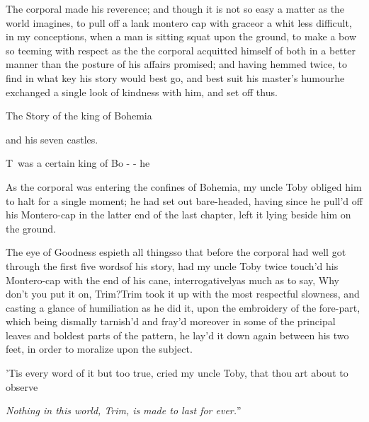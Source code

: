 \documentclass{article}
\begin{document}
The corporal made his reverence;\break
and though it is not so easy a
matter as the world imagines, to pull off a lank montero cap
with grace\tsk or a whit less difficult, in my
conceptions, when a man is sitting squat upon the ground, to make\pb 
a bow so teeming with respect as the 
\tsh the corporal acquitted himself of both in a
better manner than the posture of his affairs promised; and having
hemmed twice, to find in what key his story would best go, and best
suit his master’s humour\tsk he exchanged a single
look of kindness with him, and set off thus.

\newpage
\centerline{The Story of the king of Bohemia}
\centerline{and his seven castles.}

\lettrine{T}{\,} was a certain king of\break
Bo - - he\tsh

As the corporal was entering the confines of Bohemia, my
uncle Toby obliged him to halt for a single moment; he had
set out bare-headed, having since he pull’d off his
Montero-cap in the latter end of the last chapter, left it
lying beside him on the ground.

\tsh The eye of Goodness espieth all things\tsh so that before the corporal had
well got through the first five words\pb of his story, had my uncle Toby twice
touch’d his Montero-cap with the end of his cane, interrogatively\tsh as much as to
say, Why don’t you put it on, Trim?\break Trim took it up with the most respectful
slowness, and casting a glance of humiliation as he did it, upon the embroidery of
the fore-part, which being dismally tarnish’d and fray’d moreover in some of the
principal leaves and boldest parts of the pattern, he lay’d it down again between
his two feet, in order to moralize upon the subject.

\tsh ’Tis every word of it but too true, cried my
uncle Toby, that thou art about to observe\tsh\

\newpage\indent
\lqq\textit{Nothing in this world, Trim, is}\break
\lqq\textit{made to last for ever.}”
\end{document}
